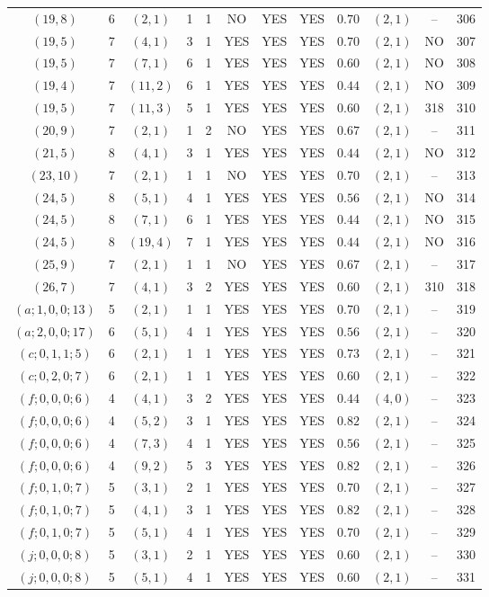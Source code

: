 \begin{longtable}{|c|c|c|c|c|c|c|c|c|c|c|c|}
$(19,8)$ & 6 & $(2,1)$ & 1 & 1 & NO & YES & YES & $0.70$ & $(2,1)$ & -- & 306\\
$(19,5)$ & 7 & $(4,1)$ & 3 & 1 & YES & YES & YES & $0.70$ & $(2,1)$ & NO & 307\\
$(19,5)$ & 7 & $(7,1)$ & 6 & 1 & YES & YES & YES & $0.60$ & $(2,1)$ & NO & 308\\
$(19,4)$ & 7 & $(11,2)$ & 6 & 1 & YES & YES & YES & $0.44$ & $(2,1)$ & NO & 309\\
$(19,5)$ & 7 & $(11,3)$ & 5 & 1 & YES & YES & YES & $0.60$ & $(2,1)$ & 318 & 310\\
$(20,9)$ & 7 & $(2,1)$ & 1 & 2 & NO & YES & YES & $0.67$ & $(2,1)$ & -- & 311\\
$(21,5)$ & 8 & $(4,1)$ & 3 & 1 & YES & YES & YES & $0.44$ & $(2,1)$ & NO & 312\\
$(23,10)$ & 7 & $(2,1)$ & 1 & 1 & NO & YES & YES & $0.70$ & $(2,1)$ & -- & 313\\
$(24,5)$ & 8 & $(5,1)$ & 4 & 1 & YES & YES & YES & $0.56$ & $(2,1)$ & NO & 314\\
$(24,5)$ & 8 & $(7,1)$ & 6 & 1 & YES & YES & YES & $0.44$ & $(2,1)$ & NO & 315\\
$(24,5)$ & 8 & $(19,4)$ & 7 & 1 & YES & YES & YES & $0.44$ & $(2,1)$ & NO & 316\\
$(25,9)$ & 7 & $(2,1)$ & 1 & 1 & NO & YES & YES & $0.67$ & $(2,1)$ & -- & 317\\
$(26,7)$ & 7 & $(4,1)$ & 3 & 2 & YES & YES & YES & $0.60$ & $(2,1)$ & 310 & 318\\
$(a;1,0,0;13)$ & 5 & $(2,1)$ & 1 & 1 & YES & YES & YES & $0.70$ & $(2,1)$ & -- & 319\\
$(a;2,0,0;17)$ & 6 & $(5,1)$ & 4 & 1 & YES & YES & YES & $0.56$ & $(2,1)$ & -- & 320\\
$(c;0,1,1;5)$ & 6 & $(2,1)$ & 1 & 1 & YES & YES & YES & $0.73$ & $(2,1)$ & -- & 321\\
$(c;0,2,0;7)$ & 6 & $(2,1)$ & 1 & 1 & YES & YES & YES & $0.60$ & $(2,1)$ & -- & 322\\
$(f;0,0,0;6)$ & 4 & $(4,1)$ & 3 & 2 & YES & YES & YES & $0.44$ & $(4,0)$ & -- & 323\\
$(f;0,0,0;6)$ & 4 & $(5,2)$ & 3 & 1 & YES & YES & YES & $0.82$ & $(2,1)$ & -- & 324\\
$(f;0,0,0;6)$ & 4 & $(7,3)$ & 4 & 1 & YES & YES & YES & $0.56$ & $(2,1)$ & -- & 325\\
$(f;0,0,0;6)$ & 4 & $(9,2)$ & 5 & 3 & YES & YES & YES & $0.82$ & $(2,1)$ & -- & 326\\
$(f;0,1,0;7)$ & 5 & $(3,1)$ & 2 & 1 & YES & YES & YES & $0.70$ & $(2,1)$ & -- & 327\\
$(f;0,1,0;7)$ & 5 & $(4,1)$ & 3 & 1 & YES & YES & YES & $0.82$ & $(2,1)$ & -- & 328\\
$(f;0,1,0;7)$ & 5 & $(5,1)$ & 4 & 1 & YES & YES & YES & $0.70$ & $(2,1)$ & -- & 329\\
$(j;0,0,0;8)$ & 5 & $(3,1)$ & 2 & 1 & YES & YES & YES & $0.60$ & $(2,1)$ & -- & 330\\
$(j;0,0,0;8)$ & 5 & $(5,1)$ & 4 & 1 & YES & YES & YES & $0.60$ & $(2,1)$ & -- & 331
\end{longtable}
